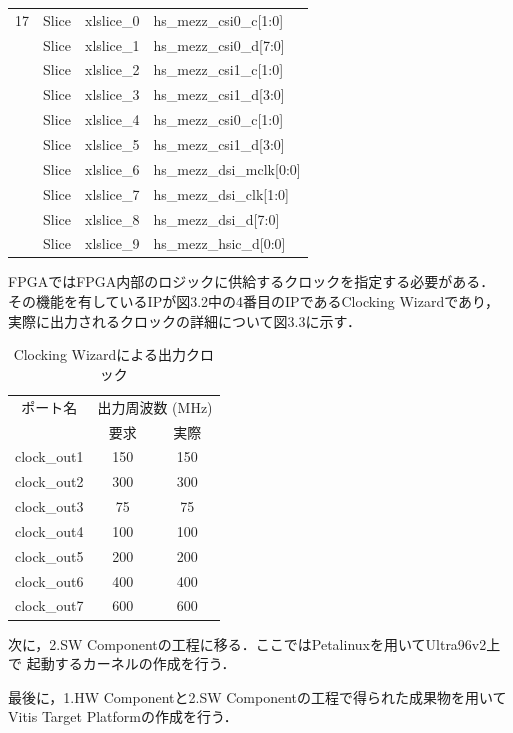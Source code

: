 \documentclass[11pt,a4j]{jreport}
\begin{document}
\begin{table}[H]
\begin{tabular}{clll}
    17 & Slice & xlslice_0 & hs_mezz_csi0_c[1:0] \\
    & Slice & xlslice_1 & hs_mezz_csi0_d[7:0] \\
    & Slice & xlslice_2 & hs_mezz_csi1_c[1:0] \\
    & Slice & xlslice_3 & hs_mezz_csi1_d[3:0] \\
    & Slice & xlslice_4 & hs_mezz_csi0_c[1:0] \\
    & Slice & xlslice_5 & hs_mezz_csi1_d[3:0] \\
    & Slice & xlslice_6 & hs_mezz_dsi_mclk[0:0] \\
    & Slice & xlslice_7 & hs_mezz_dsi_clk[1:0] \\
    & Slice & xlslice_8 & hs_mezz_dsi_d[7:0] \\
    & Slice & xlslice_9 & hs_mezz_hsic_d[0:0] \\
  \hline
  \end{tabular}
\end{table}
FPGAではFPGA内部のロジックに供給するクロックを指定する必要がある．
その機能を有しているIPが図3.2中の4番目のIPであるClocking Wizardであり，
実際に出力されるクロックの詳細について図3.3に示す．
\begin{table}[hbtp]
  \caption{Clocking Wizardによる出力クロック}
  \label{physics}
  \centering
  \begin{tabular}{ccc}
    \hline
    ポート名 & \multicolumn{2}{c}{出力周波数 (MHz)} \\
    \cmidrule(lr){2-3}
     & 要求 & 実際 \\
    \hline
    clock_out1 & 150 & 150 \\
    clock_out2 & 300 & 300 \\
    clock_out3 & 75 & 75 \\
    clock_out4 & 100 & 100 \\
    clock_out5 & 200 & 200 \\
    clock_out6 & 400 & 400 \\
    clock_out7 & 600 & 600 \\
    \hline
    \end{tabular}
\end{table}

次に，2.SW Componentの工程に移る．ここではPetalinuxを用いてUltra96v2上で
起動するカーネルの作成を行う．

最後に，1.HW Componentと2.SW Componentの工程で得られた成果物を用いて
Vitis Target Platformの作成を行う．
\end{document}
